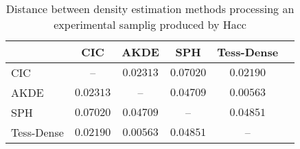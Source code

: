 \documentclass[10pt,a4paper,twoside,twocolumn]{article}
\newcommand*{\rootPath}{../}
\begin{document}
\begin{table*}[!ht]
	\centering
	\begin{tabular}{|l|c|c|c|c|c|}
		\hline
								& CIC				& AKDE			& SPH				& Tess-Dense\\
		\hline
		CIC					& --				& $0.02313$	& $0.07020$	& $0.02190$	\\
		AKDE				&	$0.02313$	& --				& $0.04709$	& $0.00563$	\\
		SPH					&	$0.07020$	& $0.04709$	& --				& $0.04851$	\\
		Tess-Dense	&	$0.02190$	& $0.00563$	& $0.04851$	& --				\\
		\hline
	\end{tabular}
	\caption{Distance between density estimation methods processing an
		experimental samplig produced by Hacc}
	\label{table:hacc:distance}
\end{table*}


\ifstandalone
	
	
\fi
\end{document}
